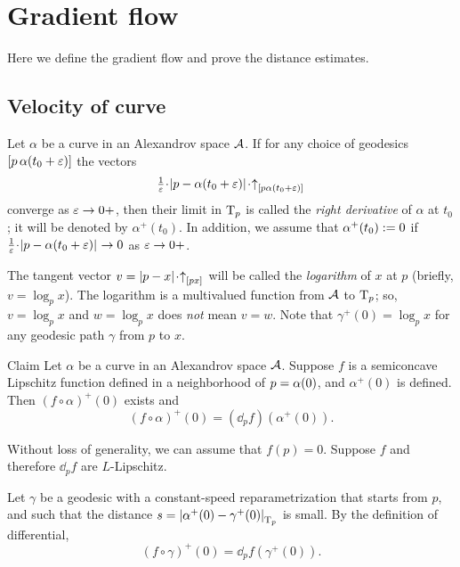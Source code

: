 
\chapter{Gradient flow}\label{chap:GF}

Here we define the gradient flow and prove the distance estimates.



\section{Velocity of curve}

Let $\alpha$ be a curve in an Alexandrov space $\mathcal{A}$.
If for any choice of 
geodesics $[p\,\alpha(t_0+\varepsilon)]$ the vectors 
\[\tfrac{1}{\eps}\cdot\dist{p}{\alpha(t_0+\eps)}{}\cdot\dir p{\alpha(t_0+\eps)}\]
converge as $\varepsilon\to 0+$, then their limit in $\mathrm{T}_p$ is called the \emph{right derivative} of $\alpha$ at $t_0$; it will be denoted by $\alpha^+(t_0)$.
In addition, we assume that $\alpha^+(t_0)\mathrel{:=}0$
if $\tfrac{1}{\eps}\cdot\dist{p}{\alpha(t_0+\eps)}{}\to 0$ as $\varepsilon\to 0+$.

The tangent vector $v=\dist px{}\cdot\dir px$ will be called the \emph{logarithm} of $x$ at $p$ (briefly, $v=\log_p x$).
The logarithm is a multivalued function from $\mathcal{A}$ to $\mathrm{T}_p$; so, $v=\log_p x$ and $w=\log_p x$ does \textit{not} mean $v=w$.
Note that $\gamma^+(0)=\log_px$ for any geodesic path $\gamma$ from $p$ to $x$.\label{page:log}

\begin{thm}{Claim}\label{clm:fa'=dfa'}
Let $\alpha$ be a curve in an Alexandrov space $\mathcal{A}$.
Suppose $f$ is a semiconcave Lipschitz function
defined in a neighborhood of $p=\alpha(0)$,
and $\alpha^+(0)$ is defined.
Then $(f\circ\alpha)^+(0)$ exists and 
\[(f\circ\alpha)^+(0)
=
(\dd_pf)(\alpha^+(0)).\]

\end{thm}

Without loss of generality, we can assume that $f(p)=0$.
Suppose $f$ and therefore $\dd_pf$ are $L$-Lipschitz.

Let $\gamma$ be a geodesic with a constant-speed reparametrization that starts from $p$, and
such that the distance
$s=|{\alpha^+(0)}-{\gamma^+(0)}|_{\mathrm{T}_p}^{{}}$
is small.
By the definition of differential,
\[(f\circ\gamma)^+(0)=\dd_pf(\gamma^+(0)).\]

